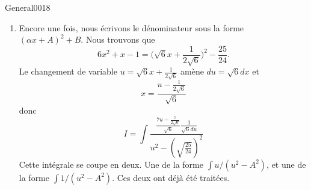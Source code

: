 \begin{corrige}{General0018}
\begin{enumerate}
\item
Encore une fois, nous écrivons le dénominateur sous la forme $(\alpha x+A)^2+B$. Nous trouvons que
\begin{equation}
	6x^2+x-1=\big( \sqrt{6}x+\frac{1}{ 2\sqrt{6} } \big)^2-\frac{ 25 }{ 24 }.
\end{equation}
Le changement de variable $u=\sqrt{6}x+\frac{1}{ 2\sqrt{6} }$ amène $du=\sqrt{6}dx$ et 
\begin{equation}
	x=\frac{ u-\frac{1}{ 2\sqrt{6} } }{ \sqrt{6}} 
\end{equation}
donc 
\begin{equation}
	I=\int \frac{ \frac{ 7u-\frac{ 7 }{ 2\sqrt{6} } }{\sqrt{6}}\frac{1}{ \sqrt{6}du } } {  u^2-\left( \sqrt{\frac{ 25 }{ 24 }} \right)^2  }
\end{equation}
Cette intégrale se coupe en deux. Une de la forme $\int u/(u^2-A^2)$, et une de la forme $\int 1/(u^2-A^2)$. Ces deux ont déjà été traitées.


\end{enumerate}


\end{corrige}
